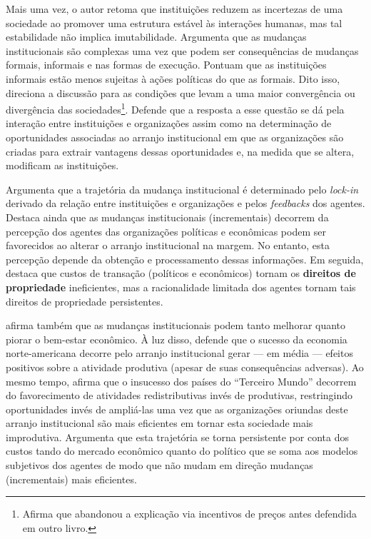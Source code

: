 Mais uma vez, o autor retoma que instituições reduzem as incertezas de uma sociedade ao promover uma estrutura estável às interações humanas, mas tal estabilidade não implica imutabilidade. Argumenta que as mudanças institucionais são complexas uma vez que podem ser consequências de mudanças formais, informais e nas formas de execução. Pontuam que as instituições informais estão menos sujeitas à ações políticas do que as formais. Dito isso, direciona a discussão para as condições que levam a uma maior convergência ou divergência das sociedades\footnote{Afirma que abandonou a explicação via incentivos de preços antes defendida em outro livro.}. Defende que a resposta a esse questão se dá pela interação entre instituições e organizações assim como na determinação de oportunidades associadas ao arranjo institucional em que as organizações são criadas para extrair vantagens dessas oportunidades e, na medida que se altera, modificam as instituições. 

Argumenta que a trajetória da mudança institucional é determinado pelo \textit{lock-in} derivado da relação entre instituições e organizações e pelos \textit{feedbacks} dos agentes. Destaca ainda que as mudanças institucionais (incrementais) decorrem da percepção dos agentes das organizações políticas e econômicas podem ser favorecidos ao alterar o arranjo institucional na margem. No entanto, esta percepção depende da obtenção e processamento dessas informações. Em seguida, destaca que custos de transação (políticos e econômicos) tornam os \textbf{direitos de propriedade} ineficientes, mas a racionalidade limitada dos agentes tornam tais direitos de propriedade persistentes.

\autor afirma também que as mudanças institucionais podem tanto melhorar quanto piorar o bem-estar econômico. À luz disso, defende que o sucesso da economia norte-americana decorre pelo arranjo institucional gerar --- em média --- efeitos positivos sobre a atividade produtiva (apesar de suas consequências adversas). Ao mesmo tempo, afirma que o insucesso dos países do ``Terceiro Mundo'' decorrem do favorecimento de atividades redistributivas invés de produtivas, restringindo oportunidades invés de ampliá-las uma vez que as organizações oriundas deste arranjo institucional são mais eficientes em tornar esta sociedade mais improdutiva. Argumenta que esta trajetória se torna persistente por conta dos custos tando do mercado econômico quanto do político que se soma aos modelos subjetivos dos agentes de modo que não mudam em direção mudanças (incrementais) mais eficientes.